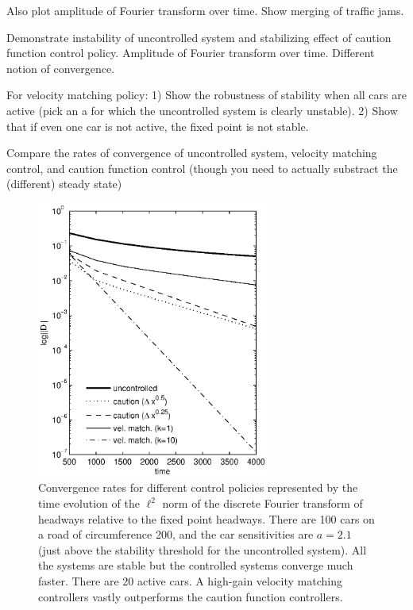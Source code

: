 \documentclass[10pt,twocolumn]{article}
\newcommand{\lm}{\fontfamily{\sfdefault}\selectfont}
\begin{document}
Also plot amplitude of Fourier transform over time. Show merging of traffic jams.

Demonstrate instability of uncontrolled system and stabilizing effect of caution function control policy. Amplitude of Fourier transform over time. Different notion of convergence.

For velocity matching policy: 1) Show the robustness of stability when all cars are active (pick an a for which the uncontrolled system is clearly unstable). 2) Show that if even one car is not active, the fixed point is not stable.

Compare the rates of convergence of uncontrolled system, velocity matching control, and caution function control (though you need to actually substract the (different) steady state)

\begin{figure}[!h]
\lm
\begin{center}
\includegraphics[width=3in]{convscl5}
\end{center}
\caption{ \label{fig:convscl5} Convergence rates for different control policies represented by the time evolution of the $\ell^2$ norm of the discrete Fourier transform of headways relative to the fixed point headways. There are 100 cars on a road of circumference 200, and the car sensitivities are $a=2.1$ (just above the stability threshold for the uncontrolled system). All the systems are stable but the controlled systems converge much faster. There are 20 active cars. A high-gain velocity matching controllers vastly outperforms the caution function controllers.}
\end{figure}
\end{document}
